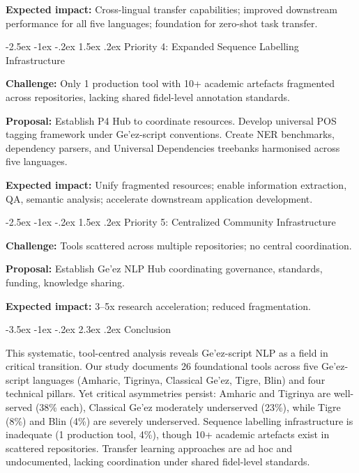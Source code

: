 \documentclass[12pt,a4paper]{article}
\makeatletter
\theoremstyle{plain}
\theoremstyle{definition}
\renewcommand{\section}{\@startsection{section}{1}{\z@}%
  {-3.5ex \@plus -1ex \@minus -.2ex}%
  {2.3ex \@plus.2ex}%
  {\large\bfseries\color{NavyBlue}}}
\renewcommand{\subsection}{\@startsection{subsection}{2}{\z@}%
  {-2.5ex \@plus -1ex \@minus -.2ex}%
  {1.5ex \@plus .2ex}%
  {\normalsize\bfseries\color{DarkGray}}}
\makeatother
\begin{document}
\textbf{Expected impact:} Cross-lingual transfer capabilities; improved downstream performance for all five languages; foundation for zero-shot task transfer.

\subsection{Priority 4: Expanded Sequence Labelling Infrastructure}

\textbf{Challenge:} Only 1 production tool with 10+ academic artefacts fragmented across repositories, lacking shared fidel-level annotation standards.

\textbf{Proposal:} Establish P4 Hub to coordinate resources. Develop universal POS tagging framework under Ge'ez-script conventions. Create NER benchmarks, dependency parsers, and Universal Dependencies treebanks harmonised across five languages.

\textbf{Expected impact:} Unify fragmented resources; enable information extraction, QA, semantic analysis; accelerate downstream application development.

\subsection{Priority 5: Centralized Community Infrastructure}

\textbf{Challenge:} Tools scattered across multiple repositories; no central coordination.

\textbf{Proposal:} Establish Ge'ez NLP Hub coordinating governance, standards, funding, knowledge sharing.

\textbf{Expected impact:} 3--5x research acceleration; reduced fragmentation.


\section{Conclusion}

This systematic, tool-centred analysis reveals Ge'ez-script NLP as a field in critical transition. Our study documents 26 foundational tools across five Ge'ez-script languages (Amharic, Tigrinya, Classical Ge'ez, Tigre, Blin) and four technical pillars. Yet critical asymmetries persist: Amharic and Tigrinya are well-served (38\% each), Classical Ge'ez moderately underserved (23\%), while Tigre (8\%) and Blin (4\%) are severely underserved. Sequence labelling infrastructure is inadequate (1 production tool, 4\%), though 10+ academic artefacts exist in scattered repositories. Transfer learning approaches are ad hoc and undocumented, lacking coordination under shared fidel-level standards.
\end{document}
